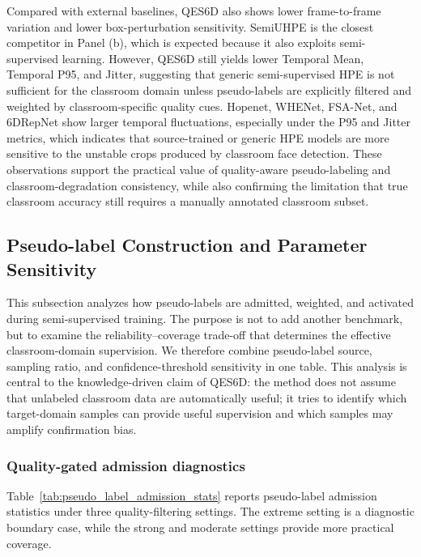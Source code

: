 \documentclass[preprint,12pt]{elsarticle}
\begin{document}
Compared with external baselines, QES6D also shows lower frame-to-frame variation and lower box-perturbation sensitivity. SemiUHPE is the closest competitor in Panel (b), which is expected because it also exploits semi-supervised learning. However, QES6D still yields lower Temporal Mean, Temporal P95, and Jitter, suggesting that generic semi-supervised HPE is not sufficient for the classroom domain unless pseudo-labels are explicitly filtered and weighted by classroom-specific quality cues. Hopenet, WHENet, FSA-Net, and 6DRepNet show larger temporal fluctuations, especially under the P95 and Jitter metrics, which indicates that source-trained or generic HPE models are more sensitive to the unstable crops produced by classroom face detection. These observations support the practical value of quality-aware pseudo-labeling and classroom-degradation consistency, while also confirming the limitation that true classroom accuracy still requires a manually annotated classroom subset.


\subsection{Pseudo-label Construction and Parameter Sensitivity}
\label{subsec:pseudo_label_analysis}

This subsection analyzes how pseudo-labels are admitted, weighted, and activated during semi-supervised training. The purpose is not to add another benchmark, but to examine the reliability--coverage trade-off that determines the effective classroom-domain supervision. We therefore combine pseudo-label source, sampling ratio, and confidence-threshold sensitivity in one table. This analysis is central to the knowledge-driven claim of QES6D: the method does not assume that unlabeled classroom data are automatically useful; it tries to identify which target-domain samples can provide useful supervision and which samples may amplify confirmation bias.

\subsubsection{Quality-gated admission diagnostics}

Table~\ref{tab:pseudo_label_admission_stats} reports pseudo-label admission statistics under three quality-filtering settings. The extreme setting is a diagnostic boundary case, while the strong and moderate settings provide more practical coverage.
\end{document}
